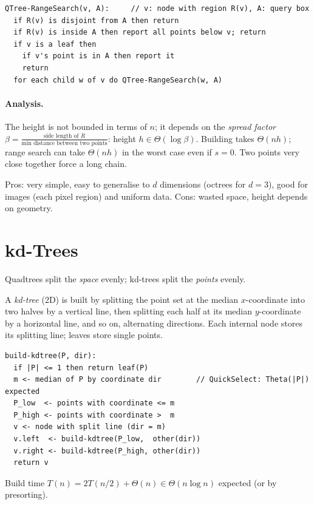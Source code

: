 \begin{lstlisting}
QTree-RangeSearch(v, A):     // v: node with region R(v), A: query box
  if R(v) is disjoint from A then return
  if R(v) is inside A then report all points below v; return
  if v is a leaf then
    if v's point is in A then report it
    return
  for each child w of v do QTree-RangeSearch(w, A)
\end{lstlisting}

\paragraph{Analysis.} The height is not bounded in terms of $n$; it depends on
the \emph{spread factor} $\beta = \frac{\text{side length of } R}{\text{min distance
between two points}}$: height $h \in \Theta(\log \beta)$. Building takes
$\Theta(nh)$; range search can take $\Theta(nh)$ in the worst case even if
$s = 0$. Two points very close together force a long chain.

Pros: very simple, easy to generalise to $d$ dimensions (octrees for $d = 3$),
good for images (each pixel region) and uniform data. Cons: wasted space, height
depends on geometry.

\section{kd-Trees}

Quadtrees split the \emph{space} evenly; kd-trees split the \emph{points} evenly.

\begin{definition}
A \emph{kd-tree} (2D) is built by splitting the point set at the median
$x$-coordinate into two halves by a vertical line, then splitting each half at
its median $y$-coordinate by a horizontal line, and so on, alternating
directions. Each internal node stores its splitting line; leaves store single
points.
\end{definition}

\begin{lstlisting}
build-kdtree(P, dir):
  if |P| <= 1 then return leaf(P)
  m <- median of P by coordinate dir        // QuickSelect: Theta(|P|) expected
  P_low  <- points with coordinate <= m
  P_high <- points with coordinate >  m
  v <- node with split line (dir = m)
  v.left  <- build-kdtree(P_low,  other(dir))
  v.right <- build-kdtree(P_high, other(dir))
  return v
\end{lstlisting}
Build time $T(n) = 2T(n/2) + \Theta(n) \in \Theta(n \log n)$ expected (or by
presorting).

